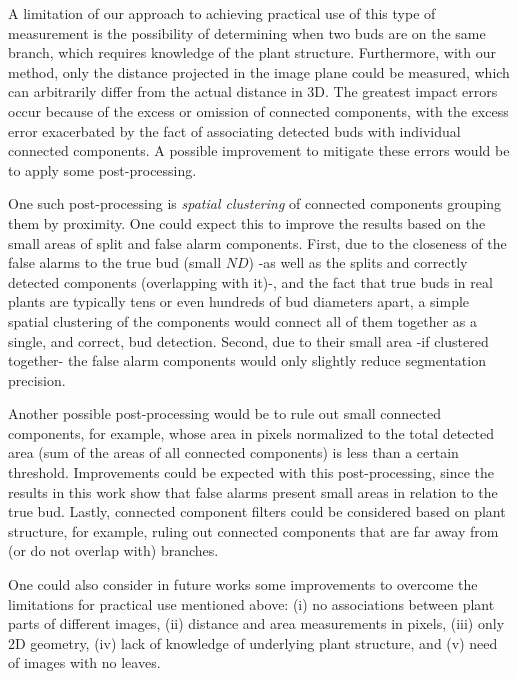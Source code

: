 \documentclass[a4paper,authoryear,review]{elsarticle}
\begin{document}
A limitation of our approach to achieving practical use of this type of measurement is the possibility of determining when two buds are on the same branch, which requires knowledge of the plant structure. Furthermore, with our method, only the distance projected in the image plane could be measured, which can arbitrarily differ from the actual distance in 3D. The  greatest impact errors occur because of the excess or omission of connected components, with the excess error exacerbated by the fact of associating detected buds with individual connected components. A possible improvement to mitigate these errors would be to apply some post-processing. 

One such post-processing is \emph{spatial clustering} of connected components grouping them by proximity. One could expect this to improve the results based on the small areas of split and false alarm components. First, due to the closeness of the false alarms to the true bud  (small $ND$) -as well as the splits and correctly detected components (overlapping with it)-,  and the fact that true buds in real plants are typically tens or even hundreds of bud diameters apart, a simple spatial clustering of the components would connect all of them together as a single, and correct, bud detection. Second, due to their small area -if clustered together- the false alarm components would only slightly reduce segmentation precision.

Another possible post-processing would be to rule out small connected components, for example, whose area in pixels normalized to the total detected area (sum of the areas of all connected components) is less than a certain threshold. Improvements could be expected with this post-processing, since the results in this work show that false alarms present small areas in relation to the true bud. Lastly, connected component filters could be considered based on plant structure, for example, ruling out connected components that are far away from (or do not overlap with) branches.

One could also consider in future works some improvements to overcome the limitations for practical use mentioned above: (i) no associations between plant parts of different images, (ii) distance and area measurements in pixels, (iii) only 2D geometry, (iv) lack of knowledge of underlying plant structure, and (v) need of images with no leaves. 
\end{document}
